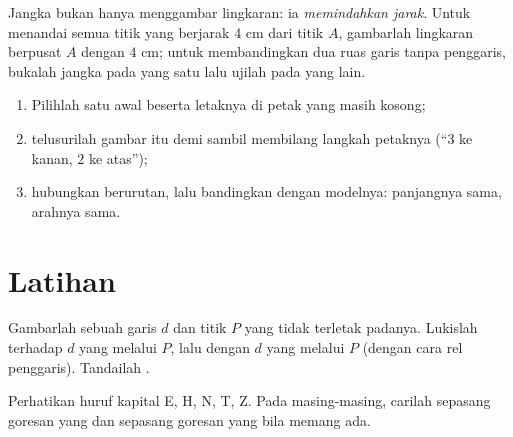 \begin{example}\label{ex:g4:geometry:compass}
Jangka bukan hanya menggambar lingkaran: ia \emph{memindahkan
jarak}. Untuk menandai semua titik yang berjarak $4$ cm dari titik
$A$, gambarlah lingkaran berpusat $A$ dengan  $4$ cm; untuk
membandingkan dua ruas garis tanpa penggaris, bukalah jangka pada
yang satu lalu ujilah pada yang lain.
\end{example}

\begin{method}\label{met:g4:geometry:reproduce}
\begin{enumerate}
  \item Pilihlah satu  awal beserta letaknya di petak yang
        masih kosong;
  \item telusurilah gambar itu  demi  sambil
        membilang langkah petaknya (``$3$ ke kanan, $2$ ke atas'');
  \item hubungkan  berurutan, lalu bandingkan dengan
        modelnya: panjangnya sama, arahnya sama.
\end{enumerate}
\end{method}

\section{Latihan}

\begin{exercise}[$\star$]\label{exo:g4:geometry:1}
Gambarlah sebuah garis $d$ dan titik $P$ yang tidak terletak
padanya. Lukislah  terhadap $d$ yang melalui $P$,
lalu  dengan $d$ yang melalui $P$ (dengan cara rel
penggaris). Tandailah .
\end{exercise}

\begin{exercise}[$\star$]\label{exo:g4:geometry:2}
Perhatikan huruf kapital E, H, N, T, Z. Pada masing-masing, carilah
sepasang goresan yang  dan sepasang goresan yang 
bila memang ada.
\end{exercise}

